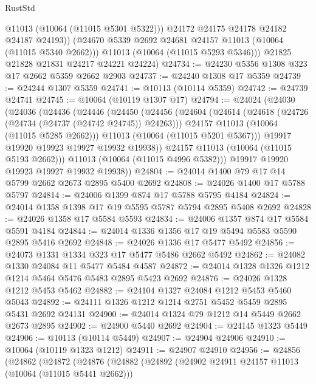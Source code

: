 \begin{lexlean}{RustStd}
\begin{coremodule}
              @11013
              (@10064 (@11015 @5301 @5322)))
            @24172
            @24175
            @24178
            @24182
            @24187
            @24193))
        (@24670 @5339 @2692 @24681 @24157 @11013 (@10064 (@11015 @5340 @2662)))
        @11013
        (@10064 (@11015 @5293 @5346)))
      @21825
      @21828
      @21831
      @24217
      @24221
      @24224)
@24734 := @24230 @5356 @1308 @323 @17 @2662 @5359 @2662 @2903
@24737 := @24240 @1308 @17 @5359
@24739 := @24244 @1307 @5359
@24741 := @10113 (@10114 @5359)
@24742 := @24739 @24741
@24745 := @10064 (@10119 @1307 @17)
@24794 := @24024
    (@24030
      (@24036
        (@24436
          (@24446
            (@24450
              (@24456
                (@24604
                  (@24614
                    (@24618 (@24726 (@24734 (@24737 (@24742 @24745)) @24263)))
                    @24157
                    @11013
                    (@10064 (@11015 @5285 @2662)))
                  @11013
                  (@10064 (@11015 @5201 @5367)))
                @19917
                @19920
                @19923
                @19927
                @19932
                @19938))
            @24157
            @11013
            (@10064 (@11015 @5193 @2662)))
          @11013
          (@10064 (@11015 @4996 @5382)))
        @19917
        @19920
        @19923
        @19927
        @19932
        @19938))
@24804 := @24014 @1400 @79 @17 @14 @5799 @2662 @2673 @2895 @5400 @2692
@24808 := @24026 @1400 @17 @5788 @5797
@24814 := @24006 @1399 @874 @17 @5788 @5795 @4184
@24824 := @24014 @1358 @1398 @17 @19 @5595 @5787 @5794 @2895 @5408 @2692
@24828 := @24026 @1358 @17 @5584 @5593
@24834 := @24006 @1357 @874 @17 @5584 @5591 @4184
@24844 := @24014 @1336 @1356 @17 @19 @5494 @5583 @5590 @2895 @5416 @2692
@24848 := @24026 @1336 @17 @5477 @5492
@24856 := @24073 @1331 @1334 @323 @17 @5477 @5486 @2662 @5492
@24862 := @24082 @1330 @24084 @11 @5477 @5484 @4587
@24872 := @24014 @1328 @1326 @1212 @1214 @5464 @5476 @5483 @2895 @5423 @2692
@24876 := @24026 @1328 @1212 @5453 @5462
@24882 := @24104 @1327 @24084 @1212 @5453 @5460 @5043
@24892 := @24111 @1326 @1212 @1214 @2751 @5452 @5459 @2895 @5431 @2692 @24131
@24900 := @24014 @1324 @79 @1212 @14 @5449 @2662 @2673 @2895
@24902 := @24900 @5440 @2692
@24904 := @24145 @1323 @5449
@24906 := @10113 (@10114 @5449)
@24907 := @24904 @24906
@24910 := @10064 (@10119 @1323 @1212)
@24911 := @24907 @24910
@24956 := @24856
    (@24862
      (@24872
        (@24876
          (@24882
            (@24892
              (@24902 @24911 @24157 @11013 (@10064 (@11015 @5441 @2662)))

\end{coremodule}
\end{lexlean}
